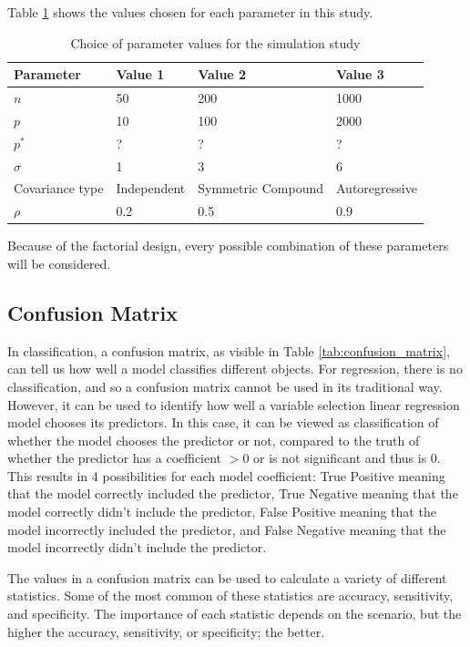 \documentclass{article}
\begin{document}
Table \ref{tab:simulation-parameters} shows the values chosen for each parameter in this study.
\begin{table}[h]
	\caption{Choice of parameter values for the simulation study}
	\label{tab:simulation-parameters}
	\begin{tabular}{l|lll}
		Parameter       & Value 1     & Value 2            & Value 3        \\ \hline
		$n$             & 50          & 200                & 1000           \\
		$p$             & 10          & 100                & 2000           \\
		$p^\ast$        & ?           & ?                  & ?              \\
		$\sigma$        & 1           & 3                  & 6              \\
		Covariance type & Independent & Symmetric Compound & Autoregressive \\
		$\rho$          & 0.2         & 0.5                & 0.9           
	\end{tabular}
\end{table}

Because of the factorial design, every possible combination of these parameters will be considered.

\subsection{Confusion Matrix}
In classification, a confusion matrix, as visible in Table \ref{tab:confusion_matrix}, can tell us how well a model classifies different objects. For regression, there is no classification, and so a confusion matrix cannot be used in its traditional way. However, it can be used to identify how well a variable selection linear regression model chooses its predictors. In this case, it can be viewed as classification of whether the model chooses the predictor or not, compared to the truth of whether the predictor has a coefficient $> 0$ or is not significant and thus is 0. This results in 4 possibilities for each model coefficient: True Positive meaning that the model correctly included the predictor, True Negative meaning that the model correctly didn't include the predictor, False Positive meaning that the model incorrectly included the predictor, and False Negative meaning that the model incorrectly didn't include the predictor.


The values in a confusion matrix can be used to calculate a variety of different statistics. Some of the most common of these statistics are accuracy, sensitivity, and specificity. The importance of each statistic depends on the scenario, but the higher the accuracy, sensitivity, or specificity; the better.
\end{document}
